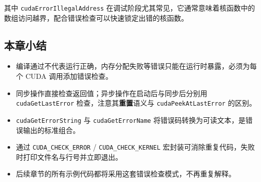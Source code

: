 其中 \texttt{cudaErrorIllegalAddress} 在调试阶段尤其常见，它通常意味着核函数中的数组访问越界，配合错误检查可以快速锁定出错的核函数。

\subsection{本章小结}

\begin{itemize}
    \item 编译通过不代表运行正确，内存分配失败等错误只能在运行时暴露，必须为每个 CUDA 调用添加错误检查。
    \item 同步操作直接检查返回值；异步操作在启动后与同步后分别用 \texttt{cudaGetLastError} 检查，注意其\textbf{重置}语义与 \texttt{cudaPeekAtLastError} 的区别。
    \item \texttt{cudaGetErrorString} 与 \texttt{cudaGetErrorName} 将错误码转换为可读文本，是错误输出的标准组合。
    \item 通过 \texttt{CUDA\_CHECK\_ERROR} / \texttt{CUDA\_CHECK\_KERNEL} 宏封装可消除重复代码，失败时打印文件名与行号并立即退出。
    \item 后续章节的所有示例代码都将采用这套错误检查模式，不再重复解释。
\end{itemize}
